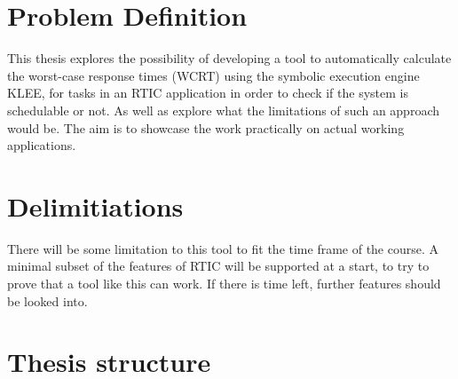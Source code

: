 
\section{Problem Definition}
This thesis explores the possibility of developing a tool to automatically
calculate the worst-case response times (WCRT) using the symbolic execution
engine KLEE, for tasks in an RTIC application in order to check if the system
is schedulable or not. As well as explore what the limitations of such an
approach would be. The aim is to showcase the work practically on actual
working applications.

\section{Delimitiations}
There will be some limitation to this tool to fit the time frame of the course.
A minimal subset of the features of RTIC will be supported at a start, to try
to prove that a tool like this can work. If there is time left, further
features should be looked into.

\section{Thesis structure}
